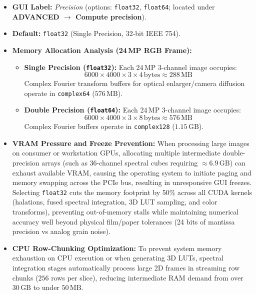 \documentclass[11pt,a4paper]{article}
\begin{document}
\begin{itemize}[leftmargin=*]
    \item \textbf{GUI Label:} \textit{Precision} (options: \texttt{float32}, \texttt{float64}; located under \textbf{ADVANCED $\to$ Compute precision}).
    \item \textbf{Default:} \texttt{float32} (Single Precision, 32-bit IEEE 754).
    \item \textbf{Memory Allocation Analysis (24\,MP RGB Frame):}
    \begin{itemize}
        \item \textbf{Single Precision (\texttt{float32}):} Each 24\,MP 3-channel image occupies:
        \begin{equation}
        6000 \times 4000 \times 3 \times 4\,\text{bytes} \approx 288\,\text{MB}
        \end{equation}
        Complex Fourier transform buffers for optical enlarger/camera diffusion operate in \texttt{complex64} ($576\,\text{MB}$).
        \item \textbf{Double Precision (\texttt{float64}):} Each 24\,MP 3-channel image occupies:
        \begin{equation}
        6000 \times 4000 \times 3 \times 8\,\text{bytes} \approx 576\,\text{MB}
        \end{equation}
        Complex Fourier buffers operate in \texttt{complex128} ($1.15\,\text{GB}$).
    \end{itemize}
    \item \textbf{VRAM Pressure and Freeze Prevention:}
    When processing large images on consumer or workstation GPUs, allocating multiple intermediate double-precision arrays (such as $36$-channel spectral cubes requiring $\approx 6.9\,\text{GB}$) can exhaust available VRAM, causing the operating system to initiate paging and memory swapping across the PCIe bus, resulting in unresponsive GUI freezes. Selecting \texttt{float32} cuts the memory footprint by 50\% across all CUDA kernels (halations, fused spectral integration, 3D LUT sampling, and color transforms), preventing out-of-memory stalls while maintaining numerical accuracy well beyond physical film/paper tolerances (24 bits of mantissa precision vs analog grain noise).
    \item \textbf{CPU Row-Chunking Optimization:}
    To prevent system memory exhaustion on CPU execution or when generating 3D LUTs, spectral integration stages automatically process large 2D frames in streaming row chunks ($256$ rows per slice), reducing intermediate RAM demand from over $30\,\text{GB}$ to under $50\,\text{MB}$.
\end{itemize}
\end{document}
